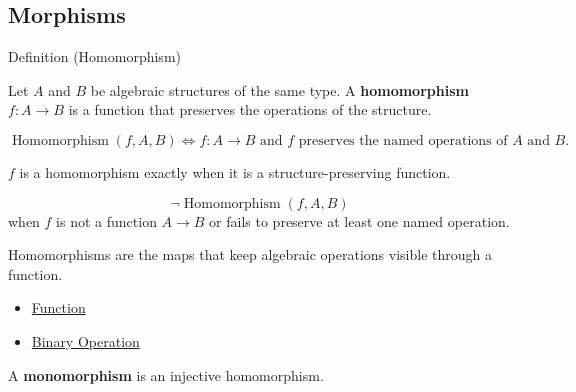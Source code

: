 \subsection*{Morphisms}
\label{subsec:morphisms}

\begin{definitionbox}{Definition (Homomorphism)}
\begin{definition}[Homomorphism]
\label{def:algebraic-homomorphism}
Let $A$ and $B$ be algebraic structures of the same type.
A \textbf{homomorphism} $f:A\to B$ is a function that preserves the operations
of the structure.
\end{definition}
\end{definitionbox}

\begin{remark*}
\[
\operatorname{Homomorphism}(f,A,B)
\Longleftrightarrow
f:A\to B
\text{ and } f \text{ preserves the named operations of }A\text{ and }B.
\]
\end{remark*}

\begin{remark*}
$f$ is a homomorphism exactly when it is a structure-preserving function.
\end{remark*}

\begin{remark*}
\[
\neg\operatorname{Homomorphism}(f,A,B)
\]
when $f$ is not a function $A\to B$ or fails to preserve at least one named
operation.
\end{remark*}

\begin{remark*}[Interpretation]
Homomorphisms are the maps that keep algebraic operations visible through a
function.
\end{remark*}

\begin{dependencies}
\begin{itemize}
  \item \hyperref[def:alg-function]{Function}
  \item \hyperref[def:binary-operation]{Binary Operation}
\end{itemize}
\end{dependencies}

\begin{definition}[Monomorphism]
\label{def:monomorphism}
A \textbf{monomorphism} is an injective homomorphism.
\end{definition}

